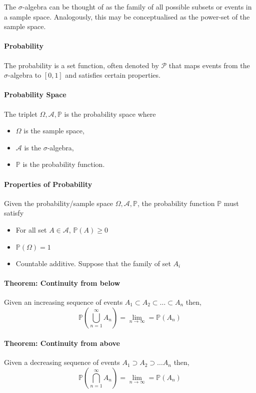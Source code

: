 The \(\sigma\)-algebra can be thought of as the family of all possible
subsets or events in a sample space. Analogously, this may be
conceptualised as the power-set of the sample space.

\paragraph {Probability}
The probability is a set function, often denoted by \(\mathcal{P}\) that maps events from
the \(\sigma\)-algebra to \([0, 1]\) and satisfies certain properties.

\paragraph{Probability Space}
The triplet \(\Omega, \mathcal{A}, \mathbb{P}\) is the probability space where
\begin{itemize}
    \item \(\Omega\) is the sample space,
    \item \(\mathcal{A}\) is the \(\sigma\)-algebra,
    \item \(\mathbb{P}\) is the probability function.
\end{itemize}

\paragraph {Properties of Probability}
Given the probability/sample space \(\Omega, \mathcal{A}, \mathbb{P}\), the probability
function \(\mathbb{P}\) must satisfy
\begin{itemize}
    \item For all set \(A\in \mathcal{A}\), \(\mathbb{P}(A) \geq 0\)
    \item \(\mathbb{P}(\Omega) = 1\) 
    \item Countable additive. Suppose that the family of set \(A_i\) %
\end{itemize}

\paragraph {Theorem: Continuity from below}
Given an increasing sequence of events \(A_1 \subset A_2 \subset \dots \subset A_n\)
then, \[
    \mathbb{P}\left(
        \bigcup_{n=1}^{\infty} A_n
    \right)
    =
    \lim_{n\to\infty} = \mathbb{P} (A_n)
\]

\paragraph {Theorem: Continuity from above}
Given a decreasing sequence of events \(A_1 \supset A_2 \supset \dots A_n\)
then, \[
    \mathbb{P}\left(
        \bigcap_{n=1}^{\infty} A_n
    \right)
    =
    \lim_{n\to\infty} = \mathbb{P} (A_n)
\]

